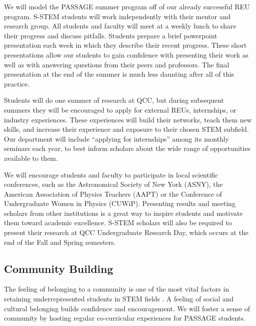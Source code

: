 \documentclass[12pt]{article}
\begin{document}
We will model the PASSAGE summer program off of our already successful REU program.  S-STEM students will work independently with their mentor and research group.  All students and faculty will meet at a weekly lunch to share their progress and discuss pitfalls.  Students prepare a brief powerpoint presentation each week in which they describe their recent progress.  These short presentations allow our students to gain confidence with presenting their work as well as with answering questions from their peers and professors.  The final presentation at the end of the summer is much less daunting after all of this practice.  

Students will do one summer of research at QCC, but during subsequent summers they will be encouraged to apply for external REUs, internships, or industry experiences.  These experiences will build their networks, teach them new skills, and  increase their experience and exposure to their chosen STEM subfield.  Our department will include ``applying for internships'' among its monthly seminars each year, to best inform scholars about the wide range of opportunities available to them.  

We will encourage students and faculty to participate in local scientific conferences, such as the Astronomical Society of New York (ASNY), the American Association of Physics Teachers (AAPT) or the Conference of Undergraduate Women in Physics (CUWiP).  Presenting results and meeting scholars from other institutions is a great way to inspire students and motivate them toward academic excellence.  S-STEM scholars will also be required to present their research at QCC Undergraduate Research Day, which occurs at the end of the Fall and Spring semesters.


\vspace{-3mm}

\subsection{Community Building}
The feeling of belonging to a community is one of the most vital factors in retaining underrepresented students in STEM fields \citep{dyer14,Gonzales,Burrows}.  A feeling of social and cultural belonging builds confidence and encouragement.  We will foster a sense of community by hosting regular co-curricular experiences for PASSAGE students.  
\end{document}
